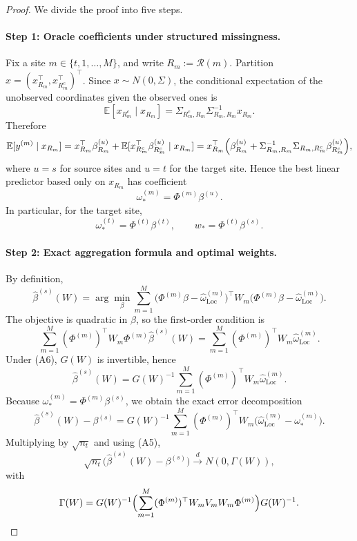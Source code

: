\documentclass[11pt]{article}
\newcommand{\1}{\mathbf{1}}
\begin{document}
\begin{proof}
We divide the proof into five steps.

\paragraph{Step 1: Oracle coefficients under structured missingness.}
Fix a site \(m\in\{t,1,\dots,M\}\), and write \(R_m:=\mathcal R(m)\).
Partition \(x=(x_{R_m}^\top,x_{R_m^c}^\top)^\top\). Since \(x\sim N(0,\Sigma)\),
the conditional expectation of the unobserved coordinates given the observed ones is
\[
\mathbb E[x_{R_m^c}\mid x_{R_m}]
=
\Sigma_{R_m^c,R_m}\Sigma_{R_m,R_m}^{-1}x_{R_m}.
\]
Therefore
\[
\mathbb E[y^{(m)}\mid x_{R_m}]
=
x_{R_m}^\top \beta_{R_m}^{(u)}
+\mathbb E[x_{R_m^c}^\top\beta_{R_m^c}^{(u)}\mid x_{R_m}]
=
x_{R_m}^\top
\Bigl(
\beta_{R_m}^{(u)}
+\Sigma_{R_m,R_m}^{-1}\Sigma_{R_m,R_m^c}\beta_{R_m^c}^{(u)}
\Bigr),
\]
where \(u=s\) for source sites and \(u=t\) for the target site.
Hence the best linear predictor based only on \(x_{R_m}\) has coefficient
\[
\omega_*^{(m)}=\Phi^{(m)}\beta^{(u)}.
\]
In particular, for the target site,
\[
\omega_*^{(t)}=\Phi^{(t)}\beta^{(t)},
\qquad
w_*=\Phi^{(t)}\beta^{(s)}.
\]

\paragraph{Step 2: Exact aggregation formula and optimal weights.}
By definition,
\[
\widehat\beta^{(s)}(W)
=
\arg\min_\beta
\sum_{m=1}^M
\bigl(\Phi^{(m)}\beta-\widehat\omega_{\mathrm{Loc}}^{(m)}\bigr)^\top
W_m
\bigl(\Phi^{(m)}\beta-\widehat\omega_{\mathrm{Loc}}^{(m)}\bigr).
\]
The objective is quadratic in \(\beta\), so the first-order condition is
\[
\sum_{m=1}^M (\Phi^{(m)})^\top W_m \Phi^{(m)} \widehat\beta^{(s)}(W)
=
\sum_{m=1}^M (\Phi^{(m)})^\top W_m \widehat\omega_{\mathrm{Loc}}^{(m)}.
\]
Under (A6), \(G(W)\) is invertible, hence
\[
\widehat\beta^{(s)}(W)
=
G(W)^{-1}\sum_{m=1}^M (\Phi^{(m)})^\top W_m\widehat\omega_{\mathrm{Loc}}^{(m)}.
\]
Because \(\omega_*^{(m)}=\Phi^{(m)}\beta^{(s)}\), we obtain the exact error decomposition
\[
\widehat\beta^{(s)}(W)-\beta^{(s)}
=
G(W)^{-1}
\sum_{m=1}^M (\Phi^{(m)})^\top W_m
\bigl(\widehat\omega_{\mathrm{Loc}}^{(m)}-\omega_*^{(m)}\bigr).
\]
Multiplying by \(\sqrt{n_t}\) and using (A5),
\[
\sqrt{n_t}\bigl(\widehat\beta^{(s)}(W)-\beta^{(s)}\bigr)
\overset{d}{\longrightarrow}
N(0,\Gamma(W)),
\]
with
\[
\Gamma(W)
=
G(W)^{-1}
\Bigl(\sum_{m=1}^M (\Phi^{(m)})^\top W_m V_m W_m \Phi^{(m)}\Bigr)
G(W)^{-1}.
\]


\end{proof}
\end{document}
